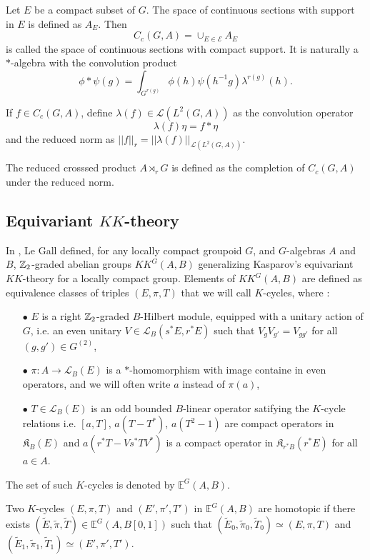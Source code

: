 Let $E$ be a compact subset of $G$. The space of continuous sections with support in $E$ is defined as $A_E$. Then 
\[C_c(G,A) = \cup_{E\in \mathcal E} A_E\]
is called the space of continuous sections with compact support. It is naturally a $*$-algebra with the convolution product
\[\phi\ast \psi (g) = \int_{G^{r(g)}} \phi(h)\psi(h^{-1}g)\lambda^{r(g)}(h).\] 

If $f\in C_c(G,A)$, define $\lambda(f)\in \mathcal L(L^2(G,A))$ as the convolution operator 
\[\lambda(f)\eta = f\ast \eta\]
and the reduced norm as $||f||_r= ||\lambda(f)||_{\mathcal L(L^2(G,A))}$.
\begin{definition}
The reduced crosssed product $A\rtimes_r G$ is defined as the completion of $C_c(G,A)$ under the reduced norm.
\end{definition}

\subsection{Equivariant $KK$-theory}

In \cite{LeGall}, Le Gall defined, for any locally compact groupoid $G$, and $G$-algebras $A$ and $B$, $\mathbb Z_2$-graded abelian groups $KK^G(A,B)$ generalizing Kasparov's equivariant $KK$-theory for a locally compact group. Elements of $KK^G(A,B)$ are defined as equivalence classes of triples $(E,\pi,T)$ that we will call $K$-cycles, where :
\begin{itemize}
\item[$\bullet$] $E$ is a right $\mathbb Z_2$-graded $B$-Hilbert module, equipped with a unitary action of $G$, i.e. an even unitary $V\in\mathcal L_B(s^*E,r^*E)$ such that $V_g V_{g'} = V_{gg'}$ for all $(g,g')\in G^{(2)}$,
\item[$\bullet$] $\pi : A\rightarrow \mathcal L_B(E)$ is a $*$-homomorphism with image containe in even operators, and we will often write $a$ instead of $\pi(a)$,
\item[$\bullet$] $T\in\mathcal L_B(E)$ is an odd bounded $B$-linear operator satifying the $K$-cycle relations i.e. $[a, T]$, $a(T-T^*)$, $a(T^2-1)$ are compact operators in $\mathfrak K_B(E)$ and $a(r^* T -V s^*T V^*)$ is a compact operator in $\mathfrak K_{r^* B}(r^* E)$ for all $a\in A$.
\end{itemize} 

The set of such $K$-cycles is denoted by $\mathbb E^G(A,B)$.

\begin{definition}
Two $K$-cycles $(E,\pi,T)$ and $ (E',\pi',T')$ in $\mathbb E^G(A,B)$ are homotopic if there exists $ (\tilde E,\tilde \pi,\tilde T) \in\mathbb E^G(A,B[0,1])$ such that $(\tilde E_0,\tilde \pi_0,\tilde T_0)\simeq (E,\pi,T)$ and $(\tilde E_1,\tilde \pi_1,\tilde T_1)\simeq (E',\pi',T')$.
\end{definition}

